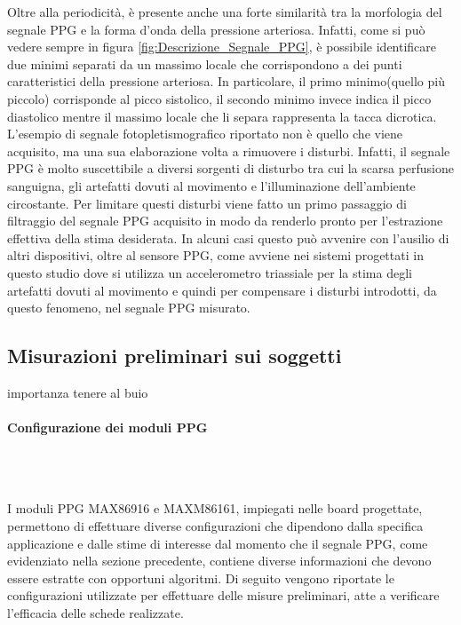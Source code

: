 Oltre alla periodicità, è presente anche una forte similarità tra la morfologia del segnale PPG e la forma d'onda della pressione arteriosa. Infatti, come si può vedere sempre in figura \ref{fig:Descrizione_Segnale_PPG}, è possibile identificare due minimi separati da un massimo locale che corrispondono a dei punti caratteristici della pressione arteriosa. In particolare, il primo minimo(quello più piccolo) corrisponde al picco sistolico, il secondo minimo invece indica il picco diastolico mentre il massimo locale che li separa rappresenta la tacca dicrotica. 
L'esempio di segnale fotopletismografico riportato non è quello che viene acquisito, ma una sua elaborazione volta a rimuovere i disturbi. Infatti, il segnale PPG è molto suscettibile a diversi sorgenti di disturbo tra cui la scarsa perfusione sanguigna, gli artefatti dovuti al movimento e l'illuminazione dell'ambiente circostante. Per limitare questi disturbi viene fatto un primo passaggio di filtraggio del segnale PPG acquisito in modo da renderlo pronto per l'estrazione effettiva della stima desiderata. In alcuni casi questo può avvenire con l'ausilio di altri dispositivi, oltre al sensore PPG, come avviene nei sistemi progettati in questo studio dove si utilizza un accelerometro triassiale per la stima degli artefatti dovuti al movimento e quindi per compensare i disturbi introdotti, da questo fenomeno, nel segnale PPG misurato.

\subsection{Misurazioni preliminari sui soggetti}
 importanza tenere al buio


\paragraph{Configurazione dei moduli PPG}~

\noindent \\ I moduli PPG MAX86916 e MAXM86161, impiegati nelle board progettate, permettono di effettuare diverse configurazioni che dipendono dalla specifica applicazione e dalle stime di interesse dal momento che il segnale PPG, come evidenziato nella sezione precedente, contiene diverse informazioni che devono essere estratte con opportuni algoritmi. Di seguito vengono riportate le configurazioni utilizzate per effettuare delle misure preliminari, atte a verificare l'efficacia delle schede realizzate.

